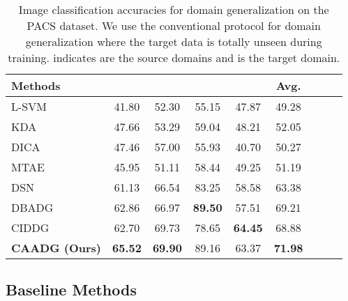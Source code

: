 \documentclass[review]{elsarticle}
\begin{document}
\begin{table*}[!htbp]
\fontsize{7}{8}\selectfont 
\begin{center}
\begin{tabular}{|l||c|c|c|c||c|c||c|c}
\hline

\textbf{Methods} & \textbf{} & \textbf{} & \textbf{} & \textbf{}&  \textbf{Avg.}\\
\hline\hline

L-SVM \cite{DBLP:journals/jmlr/FanCHWL08}  &41.80 &52.30 &55.15 &47.87 &49.28 \\

KDA \cite{812} &47.66 &53.29 &59.04 &48.21 &52.05 \\



DICA \cite{Muandet:2013:DGV:3042817.3042820}  &47.46 &57.00  &55.93 &40.70 &50.27\\



MTAE \cite{DBLP:conf/iccv/GhifaryKZB15}  &45.95 &51.11  &58.44 &49.25 &51.19\\

DSN \cite{Bousmalis:2016:DSN:3157096.3157135}   &61.13 &66.54  &83.25 &58.58 &63.38 \\


DBADG \cite{8237853}   &62.86 &66.97  &\textbf{89.50} &57.51 &69.21 \\

CIDDG \cite{Li2018eccv} &62.70 &69.73 &78.65  &\textbf{64.45}&68.88 \\




\hline
\hline
\textbf{CAADG (Ours)}  &\textbf{65.52} &\textbf{69.90}  & 89.16  &63.37  &\textbf{71.98}\\
\hline
\end{tabular}
\end{center}
\caption{Image classification accuracies for domain generalization on the PACS dataset. We use the conventional protocol for domain generalization where the target data is totally unseen during training.  indicates  are the source domains and  is the target domain.}
\label{PACS_DG}
\end{table*}

\subsection{Baseline Methods}
\end{document}
